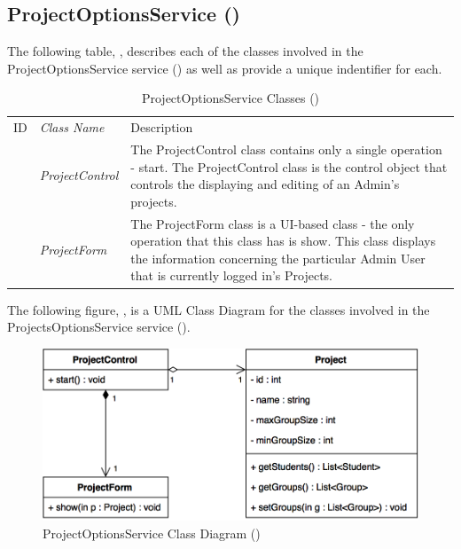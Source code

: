 \documentclass[12pt,letterpaper]{article}
\begin{document}
\subsection{ProjectOptionsService ()}

The following table, , describes each of the classes involved in the ProjectOptionsService service () as well as provide a unique indentifier for each.

\begin{table}[H]
	\caption{ProjectOptionsService Classes ()} 
	\begin{tabu} to 
	    \tableheader{}ID & Class Name & Description \\
		 & ProjectControl & The ProjectControl class contains only a single operation - start. The ProjectControl class is the control object that controls the displaying and editing of an Admin's projects.\\
		 & ProjectForm & The ProjectForm class is a UI-based class - the only operation that this class has is show. This class displays the information concerning the particular Admin User that is currently logged in's Projects.\\
	\end{tabu}
\end{table}

The following figure, , is a UML Class Diagram for the classes involved in the ProjectsOptionsService service ().

\begin{figure}[H]
	\centering{}
	\includegraphics[scale=0.35]{imgs/d3/interfaces/project-options.png}
	\caption{ProjectOptionsService Class Diagram ()}
\end{figure}
\end{document}
